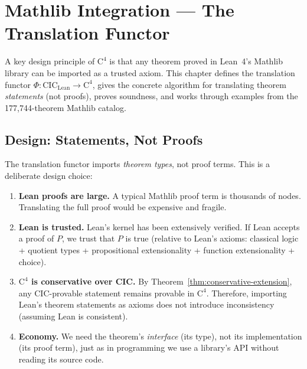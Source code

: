 
\chapter{Mathlib Integration --- The Translation Functor}
\label{ch:c4-mathlib}
\label{ch:mathlib-integration}

A key design principle of $\mathrm{C}^4$ is that any theorem proved in
Lean~4's Mathlib library can be imported as a trusted axiom.  This chapter
defines the translation functor $\Phi : \mathrm{CIC}_{\mathrm{Lean}} \to
\mathrm{C}^4$, gives the concrete algorithm for translating theorem
\emph{statements} (not proofs), proves soundness, and works through
examples from the 177,744-theorem Mathlib catalog.


\section{Design: Statements, Not Proofs}
\label{sec:statements-not-proofs}

The translation functor imports \emph{theorem types}, not proof terms.
This is a deliberate design choice:

\begin{enumerate}
\item \textbf{Lean proofs are large.}  A typical Mathlib proof term is
  thousands of nodes.  Translating the full proof would be expensive and
  fragile.

\item \textbf{Lean is trusted.}  Lean's kernel has been extensively
  verified.  If Lean accepts a proof of $P$, we trust that $P$ is
  true (relative to Lean's axioms: classical logic + quotient types +
  propositional extensionality + function extensionality + choice).

\item \textbf{$\mathrm{C}^4$ is conservative over CIC.}
  By Theorem~\ref{thm:conservative-extension}, any CIC-provable
  statement remains provable in $\mathrm{C}^4$.  Therefore, importing
  Lean's theorem statements as axioms does not introduce inconsistency
  (assuming Lean is consistent).

\item \textbf{Economy.}  We need the theorem's \emph{interface}
  (its type), not its implementation (its proof term), just as in
  programming we use a library's API without reading its source code.
\end{enumerate}

